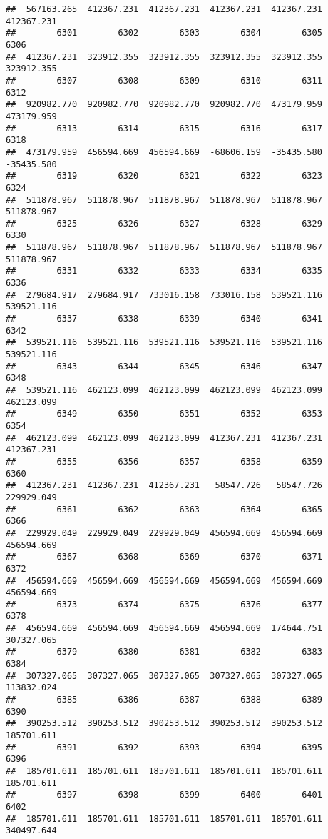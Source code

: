 \documentclass[
]{book}
\begin{document}
\begin{verbatim}
##  567163.265  412367.231  412367.231  412367.231  412367.231  412367.231 
##        6301        6302        6303        6304        6305        6306 
##  412367.231  323912.355  323912.355  323912.355  323912.355  323912.355 
##        6307        6308        6309        6310        6311        6312 
##  920982.770  920982.770  920982.770  920982.770  473179.959  473179.959 
##        6313        6314        6315        6316        6317        6318 
##  473179.959  456594.669  456594.669  -68606.159  -35435.580  -35435.580 
##        6319        6320        6321        6322        6323        6324 
##  511878.967  511878.967  511878.967  511878.967  511878.967  511878.967 
##        6325        6326        6327        6328        6329        6330 
##  511878.967  511878.967  511878.967  511878.967  511878.967  511878.967 
##        6331        6332        6333        6334        6335        6336 
##  279684.917  279684.917  733016.158  733016.158  539521.116  539521.116 
##        6337        6338        6339        6340        6341        6342 
##  539521.116  539521.116  539521.116  539521.116  539521.116  539521.116 
##        6343        6344        6345        6346        6347        6348 
##  539521.116  462123.099  462123.099  462123.099  462123.099  462123.099 
##        6349        6350        6351        6352        6353        6354 
##  462123.099  462123.099  462123.099  412367.231  412367.231  412367.231 
##        6355        6356        6357        6358        6359        6360 
##  412367.231  412367.231  412367.231   58547.726   58547.726  229929.049 
##        6361        6362        6363        6364        6365        6366 
##  229929.049  229929.049  229929.049  456594.669  456594.669  456594.669 
##        6367        6368        6369        6370        6371        6372 
##  456594.669  456594.669  456594.669  456594.669  456594.669  456594.669 
##        6373        6374        6375        6376        6377        6378 
##  456594.669  456594.669  456594.669  456594.669  174644.751  307327.065 
##        6379        6380        6381        6382        6383        6384 
##  307327.065  307327.065  307327.065  307327.065  307327.065  113832.024 
##        6385        6386        6387        6388        6389        6390 
##  390253.512  390253.512  390253.512  390253.512  390253.512  185701.611 
##        6391        6392        6393        6394        6395        6396 
##  185701.611  185701.611  185701.611  185701.611  185701.611  185701.611 
##        6397        6398        6399        6400        6401        6402 
##  185701.611  185701.611  185701.611  185701.611  185701.611  340497.644 

\end{verbatim}
\end{document}
